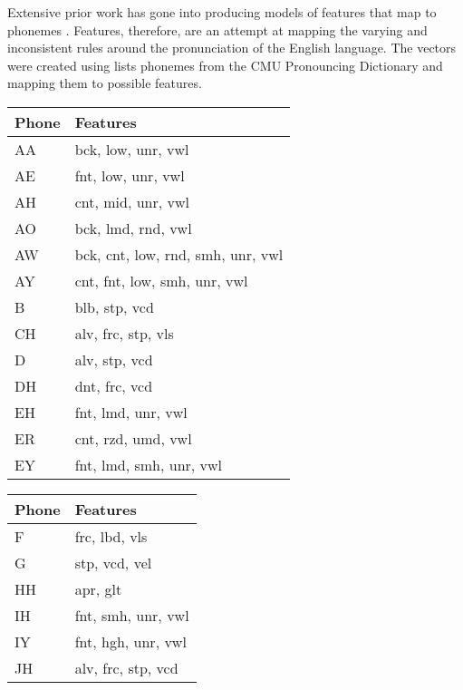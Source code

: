 Extensive prior work has gone into producing models of features that map to phonemes \cite{chomsky1968sound}\cite{ladefoged1969measurement}\cite{bradlow2010perceptual}. Features, therefore, are an attempt at mapping the varying and inconsistent rules around the pronunciation of the English language. The vectors were created using lists phonemes from the CMU Pronouncing Dictionary and mapping them to possible features.

\begin{table}[!htb]
    \tiny
    \begin{minipage}{.33\linewidth}
        \centering
        \begin{tabular}{ll}
            Phone & Features \\
            \hline
            AA & bck, low, unr, vwl \\
            AE & fnt, low, unr, vwl \\
            AH & cnt, mid, unr, vwl \\
            AO & bck, lmd, rnd, vwl \\
            AW & bck, cnt, low, rnd, smh, unr, vwl \\
            AY & cnt, fnt, low, smh, unr, vwl \\
            B & blb, stp, vcd \\
            CH & alv, frc, stp, vls \\
            D & alv, stp, vcd \\
            DH & dnt, frc, vcd \\
            EH & fnt, lmd, unr, vwl \\
            ER & cnt, rzd, umd, vwl \\
            EY & fnt, lmd, smh, unr, vwl
        \end{tabular}
    \end{minipage}%
    \begin{minipage}{.33\linewidth}
        \centering
        \begin{tabular}{ll}
            Phone & Features \\
            \hline
            F &  frc, lbd, vls \\
            G &  stp, vcd, vel \\
            HH & apr, glt \\
            IH & fnt, smh, unr, vwl \\
            IY & fnt, hgh, unr, vwl \\
            JH & alv, frc, stp, vcd \\

\end{tabular}
\end{minipage}
\end{table}
